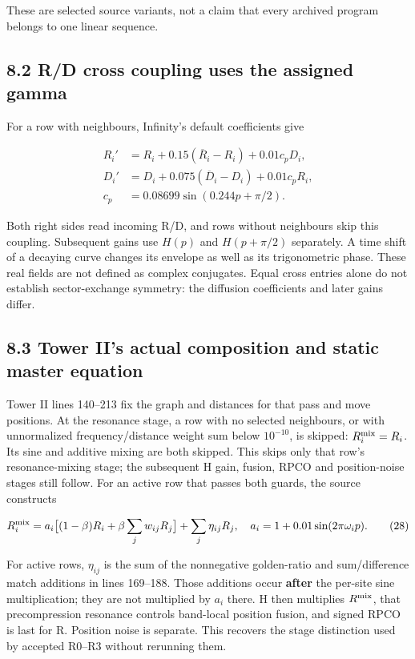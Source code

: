 \documentclass[11pt,a4paper]{article}
\begin{document}
These are selected source variants, not a claim that every archived program belongs to one linear sequence.


\subsection*{8.2 R/D cross coupling uses the assigned gamma}

For a row with neighbours, Infinity's default coefficients give


\[
\begin{aligned}
R_i'&=R_i+0.15(\overline R_i-R_i)+0.01c_pD_i,\\
D_i'&=D_i+0.075(\overline D_i-D_i)+0.01c_pR_i,\\
c_p&=0.08699\sin(0.244p+\pi/2).
\end{aligned} \tag{27}
\]

Both right sides read incoming R/D, and rows without neighbours skip this coupling. Subsequent gains use $H(p)$ and $H(p+\pi/2)$ separately. A time shift of a decaying curve changes its envelope as well as its trigonometric phase. These real fields are not defined as complex conjugates. Equal cross entries alone do not establish sector-exchange symmetry: the diffusion coefficients and later gains differ.


\subsection*{8.3 Tower II's actual composition and static master equation}

Tower II lines 140--213 fix the graph and distances for that pass and move positions. At the resonance stage, a row with no selected neighbours, or with unnormalized frequency/distance weight sum below $10^{-10}$, is skipped: $R_i^{\rm mix}=R_i$. Its sine and additive mixing are both skipped. This skips only that row's resonance-mixing stage; the subsequent H gain, fusion, RPCO and position-noise stages still follow. For an active row that passes both guards, the source constructs


\[
R_i^{\rm mix}
=a_i\big[(1-\beta)R_i+\beta\sum_jw_{ij}R_j\big]
+\sum_j\eta_{ij}R_j,\quad
a_i=1+0.01\sin(2\pi\omega_i p). \tag{28}
\]

For active rows, $\eta_{ij}$ is the sum of the nonnegative golden-ratio and sum/difference match additions in lines 169--188. Those additions occur \textbf{after} the per-site sine multiplication; they are not multiplied by $a_i$ there. H then multiplies $R^{\rm mix}$, that precompression resonance controls band-local position fusion, and signed RPCO is last for R. Position noise is separate. This recovers the stage distinction used by accepted R0--R3 without rerunning them.
\end{document}
